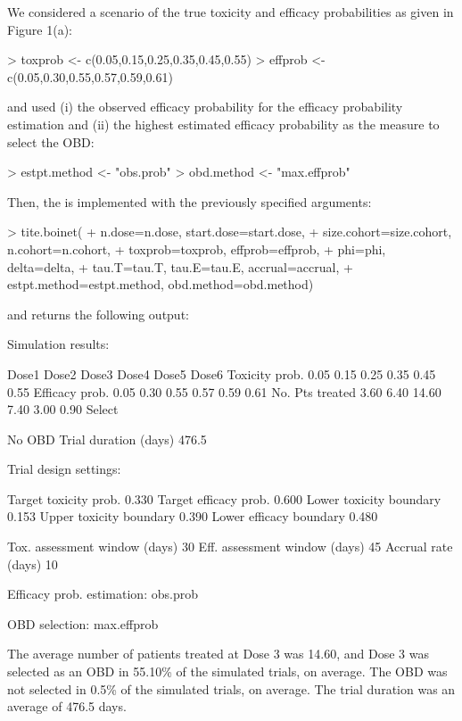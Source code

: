 We considered a scenario of the true toxicity and efficacy probabilities as given in Figure 1(a):
\begin{example}
> toxprob <- c(0.05,0.15,0.25,0.35,0.45,0.55)
> effprob <- c(0.05,0.30,0.55,0.57,0.59,0.61)
\end{example}
and used (i) the observed efficacy probability for the efficacy probability estimation and (ii) the highest estimated efficacy probability as the measure to select the OBD:
\begin{example}
> estpt.method <- "obs.prob"
> obd.method   <- "max.effprob"
\end{example}
Then, the  is implemented with the previously specified arguments:
\begin{example}
> tite.boinet(
+   n.dose=n.dose, start.dose=start.dose,
+   size.cohort=size.cohort, n.cohort=n.cohort,
+   toxprob=toxprob, effprob=effprob,
+   phi=phi, delta=delta,
+   tau.T=tau.T, tau.E=tau.E, accrual=accrual,
+   estpt.method=estpt.method, obd.method=obd.method)
\end{example}
and returns the following output:
\begin{example}
Simulation results:

                 Dose1  Dose2  Dose3  Dose4  Dose5  Dose6
Toxicity prob.    0.05   0.15   0.25   0.35   0.45   0.55
Efficacy prob.    0.05   0.30   0.55   0.57   0.59   0.61
No. Pts treated   3.60   6.40  14.60   7.40   3.00   0.90
Select %

No OBD %
Trial duration (days)  476.5

Trial design settings:

Target toxicity prob.    0.330
Target efficacy prob.    0.600
Lower toxicity boundary  0.153
Upper toxicity boundary  0.390
Lower efficacy boundary  0.480

Tox. assessment window (days)  30
Eff. assessment window (days)  45
Accrual rate (days)            10

Efficacy prob. estimation: obs.prob

OBD selection: max.effprob
\end{example}
The average number of patients treated at Dose 3 was 14.60, and Dose 3 was selected as an OBD in 55.10\% of the simulated trials, on average. The OBD was not selected in 0.5\% of the simulated trials, on average. The trial duration was an average of 476.5 days.

